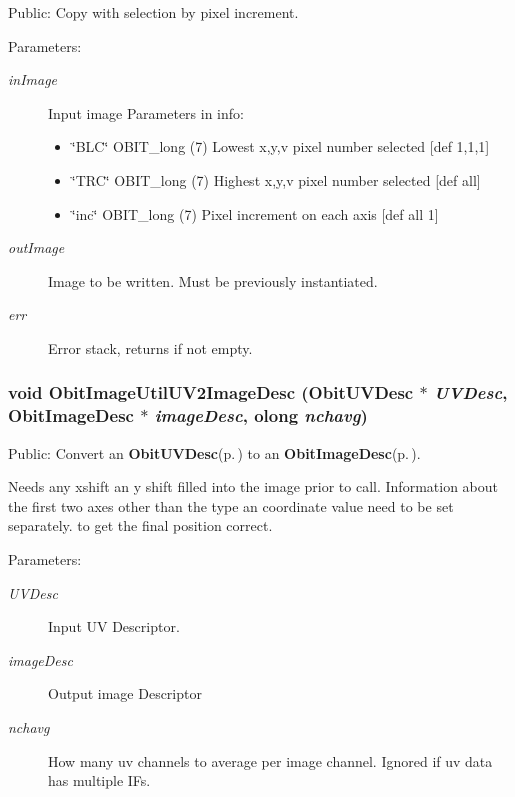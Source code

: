 Public: Copy with selection by pixel increment. 

\begin{Desc}
\item[Parameters:]
\begin{description}
\item[{\em in\-Image}]Input image Parameters in info: \begin{itemize}
\item \char`\"{}BLC\char`\"{} OBIT\_\-long (7) Lowest x,y,v pixel number selected [def 1,1,1] \item \char`\"{}TRC\char`\"{} OBIT\_\-long (7) Highest x,y,v pixel number selected [def all] \item \char`\"{}inc\char`\"{} OBIT\_\-long (7) Pixel increment on each axis [def all 1] \end{itemize}
\item[{\em out\-Image}]Image to be written. Must be previously instantiated. \item[{\em err}]Error stack, returns if not empty. \end{description}
\end{Desc}
\subsubsection{\setlength{\rightskip}{0pt plus 5cm}void Obit\-Image\-Util\-UV2Image\-Desc ({\bf Obit\-UVDesc} $\ast$ {\em UVDesc}, {\bf Obit\-Image\-Desc} $\ast$ {\em image\-Desc}, {\bf olong} {\em nchavg})}\label{ObitImageUtil_8c_a21}


Public: Convert an {\bf Obit\-UVDesc}{\rm (p.\,\pageref{structObitUVDesc})} to an {\bf Obit\-Image\-Desc}{\rm (p.\,\pageref{structObitImageDesc})}. 

Needs any xshift an y shift filled into the image prior to call. Information about the first two axes other than the type an coordinate value need to be set separately. to get the final position correct. \begin{Desc}
\item[Parameters:]
\begin{description}
\item[{\em UVDesc}]Input UV Descriptor. \item[{\em image\-Desc}]Output image Descriptor \item[{\em nchavg}]How many uv channels to average per image channel. Ignored if uv data has multiple IFs. \end{description}
\end{Desc}
